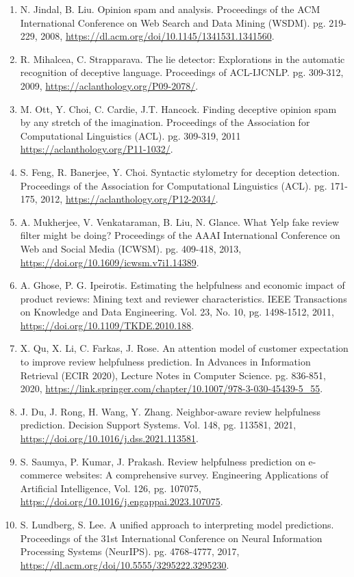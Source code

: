 \documentclass[12pt]{article}
\begin{document}
\begin{enumerate}

\item  N. Jindal, B. Liu. Opinion spam and analysis. Proceedings of the ACM International Conference on Web Search and Data Mining (WSDM). pg. 219-229, 2008,
\url{https://dl.acm.org/doi/10.1145/1341531.1341560}.

\item  R. Mihalcea, C. Strapparava. The lie detector: Explorations in the automatic recognition of deceptive language. Proceedings of ACL-IJCNLP. pg. 309-312, 2009,
\url{https://aclanthology.org/P09-2078/}.

\item M. Ott, Y. Choi, C. Cardie, J.T. Hancock. Finding deceptive opinion spam by any stretch of the imagination. Proceedings of the Association for Computational Linguistics (ACL). pg. 309-319, 2011
\url{https://aclanthology.org/P11-1032/}.

\item  S. Feng, R. Banerjee, Y. Choi. Syntactic stylometry for deception detection. Proceedings of the Association for Computational Linguistics (ACL). pg. 171-175, 2012, 
\url{https://aclanthology.org/P12-2034/}.

\item A. Mukherjee, V. Venkataraman, B. Liu, N. Glance. What Yelp fake review filter might be doing? Proceedings of the AAAI International Conference on Web and Social Media (ICWSM). pg. 409-418, 2013,   
\url{https://doi.org/10.1609/icwsm.v7i1.14389}.

\item A. Ghose, P. G. Ipeirotis. Estimating the helpfulness and economic impact of product reviews: Mining text and reviewer characteristics. IEEE Transactions on Knowledge and Data Engineering. Vol. 23, No. 10, pg. 1498-1512, 2011,   
\url{https://doi.org/10.1109/TKDE.2010.188}.

\item X. Qu, X. Li, C. Farkas, J. Rose. An attention model of customer expectation to improve review helpfulness prediction. In Advances in Information Retrieval (ECIR 2020), Lecture Notes in Computer Science. pg. 836-851, 2020,   
\url{https://link.springer.com/chapter/10.1007/978-3-030-45439-5_55}.

\item J. Du, J. Rong, H. Wang, Y. Zhang. Neighbor-aware review helpfulness prediction. Decision Support Systems. Vol. 148, pg. 113581, 2021,
\url{https://doi.org/10.1016/j.dss.2021.113581}.  
  
\item S. Saumya, P. Kumar, J. Prakash. Review helpfulness prediction on e-commerce websites: A comprehensive survey. Engineering Applications of Artificial Intelligence, Vol. 126, pg. 107075,
\url{https://doi.org/10.1016/j.engappai.2023.107075}.

\item S. Lundberg, S. Lee. A unified approach to interpreting model predictions. Proceedings of the 31st International Conference on Neural Information Processing Systems (NeurIPS). pg. 4768-4777, 2017,     
\url{https://dl.acm.org/doi/10.5555/3295222.3295230}.

\end{enumerate}
\end{document}
